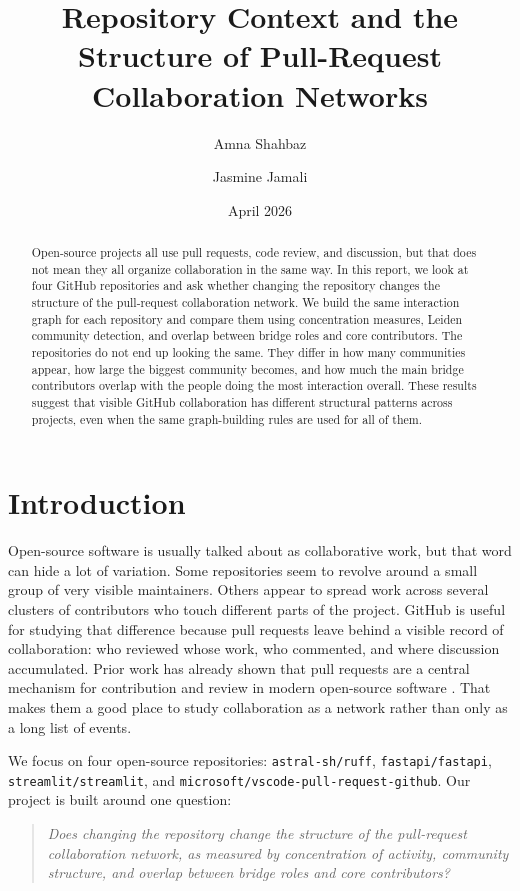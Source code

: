 \documentclass[11pt]{article}
\title{Repository Context and the Structure of Pull-Request Collaboration Networks}
\author{Amna Shahbaz \and Jasmine Jamali}
\date{April 2026}
\begin{document}
\maketitle

\begin{abstract}
Open-source projects all use pull requests, code review, and discussion, but that does not mean they all organize collaboration in the same way. In this report, we look at four GitHub repositories and ask whether changing the repository changes the structure of the pull-request collaboration network. We build the same interaction graph for each repository and compare them using concentration measures, Leiden community detection, and overlap between bridge roles and core contributors. The repositories do not end up looking the same. They differ in how many communities appear, how large the biggest community becomes, and how much the main bridge contributors overlap with the people doing the most interaction overall. These results suggest that visible GitHub collaboration has different structural patterns across projects, even when the same graph-building rules are used for all of them.
\end{abstract}

\section{Introduction}
Open-source software is usually talked about as collaborative work, but that word can hide a lot of variation. Some repositories seem to revolve around a small group of very visible maintainers. Others appear to spread work across several clusters of contributors who touch different parts of the project. GitHub is useful for studying that difference because pull requests leave behind a visible record of collaboration: who reviewed whose work, who commented, and where discussion accumulated. Prior work has already shown that pull requests are a central mechanism for contribution and review in modern open-source software \cite{gousios2014}. That makes them a good place to study collaboration as a network rather than only as a long list of events.

We focus on four open-source repositories: \texttt{astral-sh/ruff}, \texttt{fastapi/fastapi}, \texttt{streamlit/streamlit}, and \texttt{microsoft/vscode-pull-request-github}. Our project is built around one question:

\begin{quote}
\textit{Does changing the repository change the structure of the pull-request collaboration network, as measured by concentration of activity, community structure, and overlap between bridge roles and core contributors?}
\end{quote}
\end{document}
